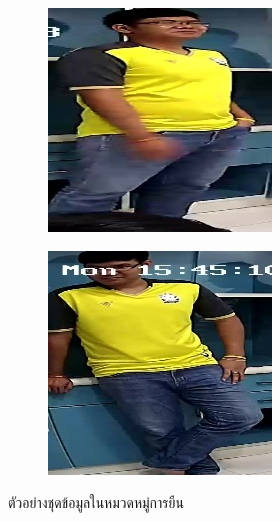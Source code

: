 \begin{figure}[!ht]
\begin{subfigure}[b]{0.45\linewidth}
    \end{subfigure}
    \begin{subfigure}[b]{0.45\linewidth}
      \includegraphics[width=\linewidth]{appendix/stand/000_CXS0_D0_000001.jpg}
    \end{subfigure}
    \begin{subfigure}[b]{0.45\linewidth}
      \includegraphics[width=\linewidth]{appendix/stand/000_CXS0_D0_000922.jpg}
    \end{subfigure}
    \caption{ตัวอย่างชุดข้อมูลในหมวดหมู่การยืน}
    \label{fig:result_track}
 \end{figure}


